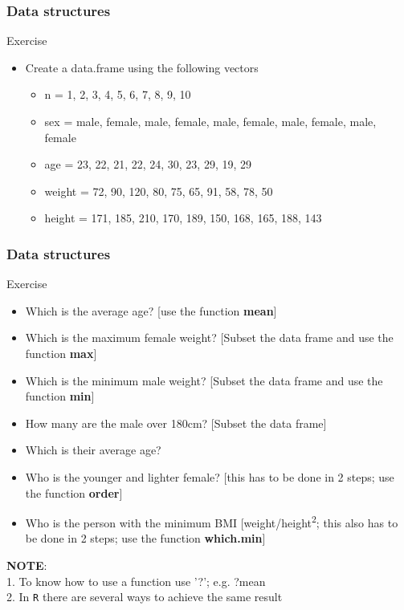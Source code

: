 \documentclass{beamer}
\begin{document}
\begin{frame}[fragile]
	\frametitle{Data structures}
	\centering \LARGE Exercise
	\begin{itemize}
		\small
		\item Create a data.frame using the following vectors
			\begin{itemize}
				\item n = 1, 2, 3, 4, 5, 6, 7, 8, 9, 10
				\item sex = male, female, male, female, male, female, male, female, male, female 
				\item age = 23, 22, 21, 22, 24, 30, 23, 29, 19, 29
				\item weight = 72, 90, 120, 80, 75, 65, 91, 58, 78, 50
				\item height = 171, 185, 210, 170, 189, 150, 168, 165, 188, 143
			\end{itemize}
	\end{itemize}
\end{frame}

\begin{frame}[fragile]
	\frametitle{Data structures}
	\centering \LARGE Exercise
	\begin{itemize}
		\small
		\item Which is the average age? \tiny [use the function \textbf{mean}]\small
		\item Which is the maximum female weight? \tiny [Subset the data frame and use the function \textbf{max}]\small
		\item Which is the minimum male weight? \tiny [Subset the data frame and use the function \textbf{min}]\small
		\item How many are the male over 180cm? \tiny [Subset the data frame] \small
		\item Which is their average age?
		\item Who is the younger and lighter female? \tiny [this has to be done in 2 steps; use the function \textbf{order}]\small
		\item Who is the person with the minimum BMI \tiny [weight/height\textsuperscript{2}; this also has to be done in 2 steps; use the function \textbf{which.min}]\small
	\end{itemize}
	\small
	\begin{flushleft} 
	\textbf{NOTE}:\\ 
	1. To know how to use a function use '?'; e.g. ?mean\\
	2. In \texttt{R} there are several ways to achieve the same result
	\end{flushleft} 
\end{frame}
\end{document}
